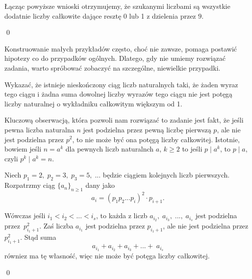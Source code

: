 \noindent
Łącząc powyższe wnioski otrzymujemy, że szukanymi liczbami są wszystkie dodatnie liczby całkowite dające resztę 0 lub 1 z dzielenia przez $9$.

\qed

\vspace{5px}

\noindent
Konstruowanie małych przykładów często, choć nie zawsze, pomaga postawić hipotezy co do przypadków ogólnych. Dlatego, gdy nie umiemy rozwiązać zadania, warto spróbować zobaczyć na szczególne, niewielkie przypadki.

\vspace{10px}


\noindent
Wykazać, że istnieje nieskończony ciąg liczb naturalnych taki, że żaden wyraz tego ciągu i żadna suma dowolnej liczby wyrazów tego ciągu nie jest potęgą liczby naturalnej o wykładniku całkowitym większym
od 1.

\vspace{5px}


\noindent
Kluczową obserwacją, która pozwoli nam rozwiązać to zadanie jest fakt, że jeśli pewna liczba naturalna $n$ jest podzielna przez pewną liczbę pierwszą $p$, ale nie jest podzielna przez $p^2$, to nie może być ona potęgą liczby całkowitej. Istotnie, bowiem jeśli $n = a^k$ dla pewnych liczb naturalnch $a$, $k \geqslant 2$ to jeśli $p \mid a^k$, to $p \mid a$, czyli $p^k \mid a^k = n$.

\vspace{5px}

\noindent
Niech $p_1 = 2,\; p_2 = 3, \; p_3 = 5, \; ...$ będzie ciągiem kolejnych liczb pierwszych.
Rozpatrzmy ciąg $\{a_n\}_{n \geqslant 1}$ dany jako
\[
    a_i = (p_1p_2...p_i)^2\cdot p_{i + 1}. 
\]

\noindent
Wówczas jeśli $i_1 < i_2 < ... < i_s$, to każda z liczb $a_{i_2}, \; a_{i_3}, \;..., \; a_{i_s}$ jest podzielna przez~$p_{i_1 + 1}^2$. Zaś liczba $a_{i_1}$ jest podzielna przez $p_{i_1 + 1}$, ale nie jest podzielna przez $p_{i_1 + 1}^2$. Stąd suma
\[
     a_{i_1} + a_{i_2} +  a_{i_3} +  ... + \; a_{i_s}
\]
równiez ma tę własność, więc nie może być potęga liczby całkowitej.

\qed

\vspace{10px}